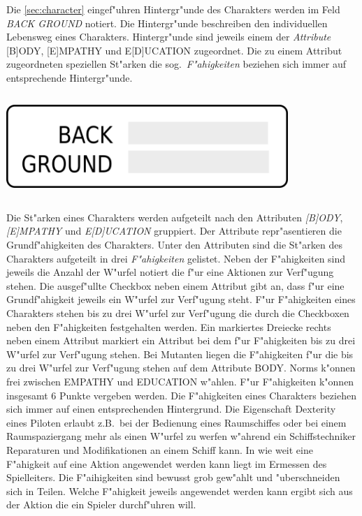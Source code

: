 \begin{column}[l]{0.52}
    Die \cref{sec:character} eingef"uhren Hintergr"unde des Charakters werden im Feld \emph{BACK GROUND} notiert. Die Hintergr"unde beschreiben den individuellen Lebensweg eines Charakters. Hintergr"unde sind jeweils einem der \emph{Attribute} [B]ODY, [E]MPATHY und E[D]UCATION zugeordnet. Die zu einem Attribut zugeordneten speziellen St"arken die sog.~\emph{F"ahigkeiten} beziehen sich immer auf entsprechende Hintergr"unde.
\end{column}
\begin{column}[r]{0.48}
    \centering
    \includegraphics[width=0.80\textwidth]{images/character_background.png}    
\end{column}

Die St"arken eines Charakters werden aufgeteilt nach den Attributen \emph{[B]ODY}, \emph{[E]MPATHY} und \emph{E[D]UCATION} gruppiert. Der Attribute repr"asentieren die Grundf"ahigkeiten des Charakters. Unter den Attributen sind die St"arken des Charakters aufgeteilt in drei \emph{F"ahigkeiten} gelistet. Neben der F"ahigkeiten sind jeweils die Anzahl der W"urfel notiert die f"ur eine Aktionen zur Verf"ugung stehen. Die ausgef"ullte Checkbox neben einem Attribut gibt an, dass f"ur eine Grundf"ahigkeit jeweils ein W"urfel zur Verf"ugung steht. F"ur F"ahigkeiten eines Charakters stehen bis zu drei W"urfel zur Verf"ugung die durch die Checkboxen neben den F"ahigkeiten festgehalten werden. Ein markiertes Dreiecke rechts neben einem Attribut markiert ein Attribut bei dem f"ur F"ahigkeiten bis zu drei W"urfel zur Verf"ugung stehen. Bei Mutanten liegen die F"ahigkeiten f"ur die bis zu drei W"urfel zur Verf"ugung stehen auf dem Attribute BODY. Norms k"onnen frei zwischen EMPATHY und EDUCATION w"ahlen. F"ur F"ahigkeiten k"onnen insgesamt 6 Punkte vergeben werden.
Die F"ahigkeiten eines Charakters beziehen sich immer auf einen entsprechenden Hintergrund. Die Eigenschaft Dexterity eines Piloten erlaubt z.B.~bei der Bedienung eines Raumschiffes oder bei einem Raumspaziergang mehr als einen W"urfel zu werfen w"ahrend ein Schiffstechniker Reparaturen und Modifikationen an einem Schiff kann. In wie weit eine F"ahigkeit auf eine Aktion angewendet werden kann liegt im Ermessen des Spielleiters. Die F"aihigkeiten sind bewusst grob gew"ahlt und "uberschneiden sich in Teilen. Welche F"ahigkeit jeweils angewendet werden kann ergibt sich aus der Aktion die ein Spieler durchf"uhren will.

